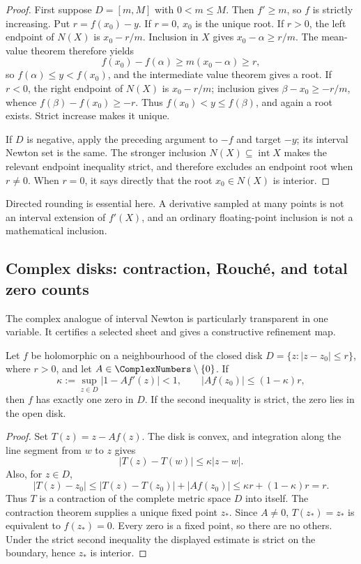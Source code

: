 \begin{proof}
First suppose \(D=[m,M]\) with \(0<m\le M\).  Then \(f'\ge m\), so \(f\) is
strictly increasing.  Put \(r=f(x_0)-y\).  If \(r=0\), \(x_0\) is the unique
root.  If \(r>0\), the left endpoint of \(N(X)\) is \(x_0-r/m\).  Inclusion in
\(X\) gives \(x_0-\alpha\ge r/m\).  The mean-value theorem therefore yields
\[
 f(x_0)-f(\alpha)\ge m(x_0-\alpha)\ge r,
\]
so \(f(\alpha)\le y<f(x_0)\), and the intermediate value theorem gives a
root.  If \(r<0\), the right endpoint of \(N(X)\) is \(x_0-r/m\); inclusion
gives \(\beta-x_0\ge-r/m\), whence
\(f(\beta)-f(x_0)\ge-r\).  Thus \(f(x_0)<y\le f(\beta)\), and again a root
exists.  Strict increase makes it unique.

If \(D\) is negative, apply the preceding argument to \(-f\) and target
\(-y\); its interval Newton set is the same.  The stronger inclusion
\(N(X)\subseteq\operatorname{int}X\) makes the relevant endpoint inequality
strict, and therefore excludes an endpoint root when \(r\ne0\).  When
\(r=0\), it says directly that the root \(x_0\in N(X)\) is interior.
\end{proof}

Directed rounding is essential here.  A derivative sampled at many points is
not an interval extension of \(f'(X)\), and an ordinary floating-point
inclusion is not a mathematical inclusion.

\subsection{Complex disks: contraction, Rouch\'e, and total zero counts}
\label{sec:complex-branch-certification}

The complex analogue of interval Newton is particularly transparent in one
variable.  It certifies a selected sheet and gives a constructive refinement
map.

\begin{theorem}
\label{thm:complex-krawczyk-disk}
Let \(f\) be holomorphic on a neighbourhood of the closed disk
\(D=\{z:\lvert z-z_0\rvert\le r\}\), where \(r>0\), and let
\(A\in\ComplexNumbers\setminus\{0\}\).  If
\[
 \kappa:=\sup_{z\in D}\lvert1-Af'(z)\rvert<1,
 \qquad
 \lvert Af(z_0)\rvert\le(1-\kappa)r,
\]
then \(f\) has exactly one zero in \(D\).  If the second inequality is strict,
the zero lies in the open disk.
\end{theorem}

\begin{proof}
Set \(T(z)=z-Af(z)\).  The disk is convex, and integration along the line
segment from \(w\) to \(z\) gives
\[
 \lvert T(z)-T(w)\rvert
 \le\kappa\lvert z-w\rvert.
\]
Also, for \(z\in D\),
\[
 \lvert T(z)-z_0\rvert
 \le\lvert T(z)-T(z_0)\rvert+\lvert Af(z_0)\rvert
 \le\kappa r+(1-\kappa)r=r.
\]
Thus \(T\) is a contraction of the complete metric space \(D\) into itself.
The contraction theorem supplies a unique fixed point \(z_*\).  Since
\(A\ne0\), \(T(z_*)=z_*\) is equivalent to \(f(z_*)=0\).  Every zero is a fixed
point, so there are no others.  Under the strict second inequality the
displayed estimate is strict on the boundary, hence \(z_*\) is interior.
\end{proof}

